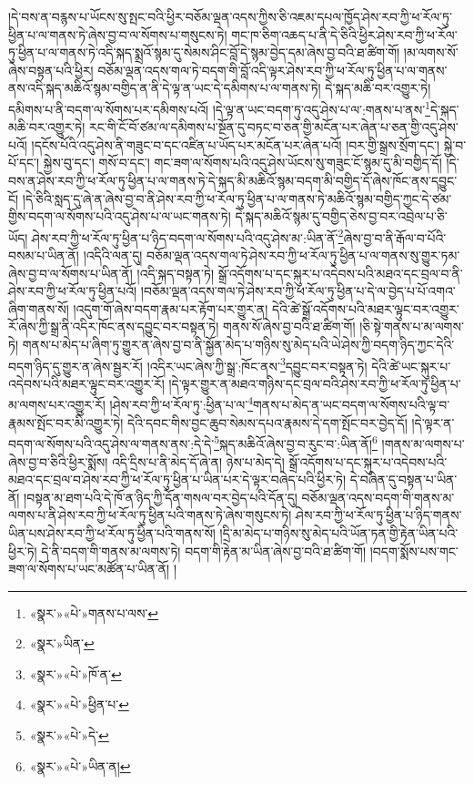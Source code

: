 །དེ་བས་ན་བརྙས་པ་ཡོངས་སུ་སྤང་བའི་ཕྱིར་བཅོམ་ལྡན་འདས་ཀྱིས་ཅི་འཇམ་དཔལ་ཁྱོད་ཤེས་རབ་ཀྱི་ཕ་རོལ་ཏུ་ཕྱིན་པ་ལ་གནས་ཏེ་ཞེས་བྱ་བ་ལ་སོགས་པ་གསུངས་ཏེ། གང་ཁ་ཅིག་འཆད་པ་ནི་དེ་ཅིའི་ཕྱིར་ཤེས་རབ་ཀྱི་ཕ་རོལ་ཏུ་ཕྱིན་པ་ལ་གནས་ཏེ་འདི་སྐད་སྨྲའོ་སྙམ་དུ་སེམས་ཤིང་བློ་དེ་སྙམ་བྱེད་དམ་ཞེས་བྱ་བའི་ཐ་ཚིག་གོ། །མ་ལགས་སོ་ཞེས་བསྟན་པའི་ཕྱིར། བཅོམ་ལྡན་འདས་གལ་ཏེ་བདག་གི་བློ་འདི་ལྟར་ཤེས་རབ་ཀྱི་ཕ་རོལ་ཏུ་ཕྱིན་པ་ལ་གནས་ནས་འདི་སྐད་མཆིའོ་སྙམ་བགྱིད་ན་ནི་དེ་ལྟ་ན་ཡང་དེ་དམིགས་པ་ལ་གནས་ཏེ། དེ་སྐད་མཆི་བར་འགྱུར་ཏེ། དམིགས་པ་ནི་བདག་ལ་སོགས་པར་དམིགས་པའོ། །དེ་ལྟ་ན་ཡང་བདག་ཏུ་འདུ་ཤེས་པ་ལ་:གནས་པ་ནས་\footnote{«སྣར་»«པེ་»གནས་པ་ལས་}དེ་སྐད་མཆི་བར་འགྱུར་ཏེ། རང་གི་ངོ་བོ་ཙམ་ལ་དམིགས་པ་སྔོན་དུ་བཏང་བ་ཅན་གྱི་མངོན་པར་ཞེན་པ་ཅན་གྱི་འདུ་ཤེས་པའོ། །དངོས་པོའི་འདུ་ཤེས་ནི་གཟུང་བ་དང་འཛིན་པ་ཡོད་པར་མངོན་པར་ཞེན་པའོ། །བར་གྱི་སྒྲས་སྲོག་དང་། སྐྱེ་བ་པོ་དང་། སྐྱེས་བུ་དང་། གསོ་བ་དང་། གང་ཟག་ལ་སོགས་པའི་འདུ་ཤེས་ཡོངས་སུ་གཟུང་ངོ་སྙམ་དུ་མི་བགྱིད་དོ། །དེ་བས་ན་ཤེས་རབ་ཀྱི་ཕ་རོལ་ཏུ་ཕྱིན་པ་ལ་གནས་ཏེ་དེ་སྐད་མི་མཆིའོ་སྙམ་བདག་མི་བགྱིད་དོ་ཞེས་ཁོང་ནས་དབྱུང་ངོ། །དེ་ཅིའི་སླད་དུ་ཞེ་ན་ཞེས་བྱ་བ་ནི་ཤེས་རབ་ཀྱི་ཕ་རོལ་ཏུ་ཕྱིན་པ་ལ་གནས་ཏེ་མཆིའོ་སྙམ་བགྱིད་ཀྱང་དེ་ཙམ་གྱིས་བདག་ལ་སོགས་པའི་འདུ་ཤེས་པ་ལ་ཡང་གནས་ཏེ། དེ་སྐད་མཆིའོ་སྙམ་དུ་བགྱིད་ཅེས་བྱ་བར་འབྲེལ་པ་ཅི་ཡོད། ཤེས་རབ་ཀྱི་ཕ་རོལ་ཏུ་ཕྱིན་པ་ཉིད་བདག་ལ་སོགས་པའི་འདུ་ཤེས་མ་:ཡིན་ནོ་\footnote{«སྣར་»ཡིན་}ཞེས་བྱ་བ་ནི་རྒོལ་བ་པོའི་བསམ་པ་ཡིན་ནོ། །འདིའི་ལན་དུ། བཅོམ་ལྡན་འདས་གལ་ཏེ་ཤེས་རབ་ཀྱི་ཕ་རོལ་ཏུ་ཕྱིན་པ་ལ་གནས་སུ་གྱུར་ཏམ་ཞེས་བྱ་བ་ལ་སོགས་པ་ཡིན་ནོ། །འདི་སྐད་བསྟན་ཏེ། སྒྲོ་འདོགས་པ་དང་སྐུར་པ་འདེབས་པའི་མཐའ་དང་བྲལ་བ་ནི་ཤེས་རབ་ཀྱི་ཕ་རོལ་ཏུ་ཕྱིན་པའོ། །བཅོམ་ལྡན་འདས་གལ་ཏེ་ཤེས་རབ་ཀྱི་ཕ་རོལ་ཏུ་ཕྱིན་པ་དེ་ལ་བྱེད་པ་པོ་འགའ་ཞིག་གནས་སོ། །འདུག་གོ་ཞེས་བདག་རྣམ་པར་རྟོག་པར་གྱུར་ན། དེའི་ཚེ་སྒྲོ་འདོགས་པའི་མཐར་ལྟུང་བར་འགྱུར་རོ་ཞེས་ཀྱི་སྒྲ་ནི་འདིར་ཁོང་ནས་དབྱུང་བར་བསྟན་ཏེ། གནས་སོ་ཞེས་བྱ་བའི་ཐ་ཚིག་གོ། །ཅི་སྟེ་གནས་པ་མ་ལགས་ཏེ། གནས་པ་མེད་པ་ཞིག་ཏུ་གྱུར་ན་ཞེས་བྱ་བ་ནི་སྐྱོན་མེད་པ་གཉིས་སུ་མེད་པའི་ཡེ་ཤེས་ཀྱི་བདག་ཉིད་ཀྱང་དེའི་བདག་ཉིད་དུ་གྱུར་ན་ཞེས་སྦྱར་རོ། །འདིར་ཡང་ཞེས་ཀྱི་སྒྲ་:ཁོང་ནས་\footnote{«སྣར་»«པེ་»ཁོ་ན་}དབྱུང་བར་བསྟན་ཏེ། དེའི་ཚེ་ཡང་སྐུར་པ་འདེབས་པའི་མཐར་ལྟུང་བར་འགྱུར་རོ། །དེ་ལྟར་གྱུར་ན་མཐའ་གཉིས་དང་བྲལ་བའི་ཤེས་རབ་ཀྱི་ཕ་རོལ་ཏུ་ཕྱིན་པ་མ་ལགས་པར་འགྱུར་རོ། །ཤེས་རབ་ཀྱི་ཕ་རོལ་ཏུ་:ཕྱིན་པ་ལ་\footnote{«སྣར་»«པེ་»ཕྱིན་པ་}གནས་པ་མེད་ན་ཡང་བདག་ལ་སོགས་པའི་ལྟ་བ་རྣམས་སྤོང་བར་མི་འགྱུར་ཏེ། དེའི་དབང་གིས་བྱང་ཆུབ་སེམས་དཔའ་རྣམས་དེ་དག་སྤོང་བར་བྱེད་དོ། །དེ་ལྟར་ན་བདག་ལ་སོགས་པའི་འདུ་ཤེས་ལ་གནས་ནས་:དེ་དེ་\footnote{«སྣར་»«པེ་»དེ་}སྐད་མཆིའོ་ཞེས་བྱ་བ་རུང་བ་:ཡིན་ནོ།\footnote{«སྣར་»«པེ་»ཡིན་ན།} །གནས་མ་ལགས་པ་ཞེས་བྱ་བ་ཅིའི་ཕྱིར་སྨོས། འདི་དྲིས་པ་ནི་མེད་དོ་ཞེ་ན། ཉེས་པ་མེད་དེ། སྒྲོ་འདོགས་པ་དང་སྐུར་པ་འདེབས་པའི་མཐའ་དང་བྲལ་བ་ཤེས་རབ་ཀྱི་ཕ་རོལ་ཏུ་ཕྱིན་པ་ཡིན་པར་དེ་ལྟར་བཞེད་པའི་ཕྱིར་ཏེ། དེ་བཞིན་དུ་བསྟན་པ་ཡིན་ནོ། །བསྟན་མ་ཐག་པའི་དེ་ཁོ་ན་ཉིད་ཀྱི་དོན་གསལ་བར་བྱེད་པའི་དོན་དུ། བཅོམ་ལྡན་འདས་བདག་གི་གནས་མ་ལགས་པ་ནི་ཤེས་རབ་ཀྱི་ཕ་རོལ་ཏུ་ཕྱིན་པའི་གནས་ཏེ་ཞེས་གསུངས་ཏེ། ཤེས་རབ་ཀྱི་ཕ་རོལ་ཏུ་ཕྱིན་པ་ཉིད་གནས་ཡིན་པས་ཤེས་རབ་ཀྱི་ཕ་རོལ་ཏུ་ཕྱིན་པའི་གནས་སོ། །དྲི་མ་མེད་པ་གཉིས་སུ་མེད་པའི་ཡོན་ཏན་གྱི་རྟེན་ཡིན་པའི་ཕྱིར་ཏེ། དེ་ནི་བདག་གི་གནས་མ་ལགས་ཏེ། བདག་གི་རྟེན་མ་ཡིན་ཞེས་བྱ་བའི་ཐ་ཚིག་གོ། །བདག་སྨོས་པས་གང་ཟག་ལ་སོགས་པ་ཡང་མཚོན་པ་ཡིན་ནོ། །
